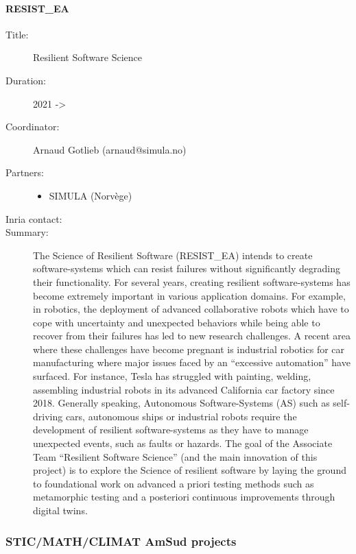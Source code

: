 \paragraph{RESIST\_EA}
\begin{description}
  \item[Title:] Resilient Software Science
  \item[Duration:] 2021 -> 
  \item[Coordinator:] Arnaud Gotlieb (arnaud@simula.no)
  \item[Partners:] \leavevmode 
  \begin{itemize}
    \item SIMULA (Norvège)
  \end{itemize}
  \item[Inria contact:] 
\item[Summary:]The Science of Resilient Software (RESIST\_EA) intends to create software-systems which can resist failures without significantly degrading their functionality. For several years, creating resilient software-systems has become extremely important in various application domains. For example, in robotics, the deployment of advanced collaborative robots which have to cope with uncertainty and unexpected behaviors while being able to recover from their failures has led to new research challenges. A recent area where these challenges have become pregnant is industrial robotics for car manufacturing where major issues faced by an “excessive automation” have surfaced. For instance, Tesla has struggled with painting, welding, assembling industrial robots in its advanced California car factory since 2018. Generally speaking, Autonomous Software-Systems (AS) such as self-driving cars, autonomous ships or industrial robots require the development of resilient software-systems as they have to manage unexpected events, such as faults or hazards.
The goal of the Associate Team “Resilient Software Science” (and the main innovation of this project) is to explore the Science of resilient software by laying the ground to foundational work on advanced a priori testing methods such as metamorphic testing and a posteriori continuous improvements through digital twins.
\end{description}


\subsubsection{STIC/MATH/CLIMAT AmSud projects}

